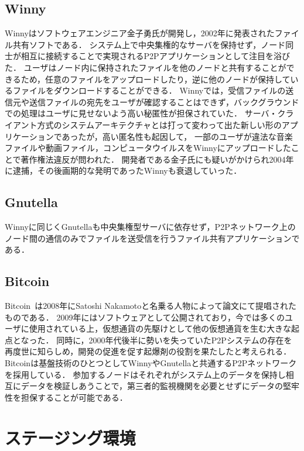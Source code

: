 \subsection{Winny}

Winnyはソフトウェアエンジニア金子勇氏が開発し，2002年に発表されたファイル共有ソフトである．
システム上で中央集権的なサーバを保持せず，ノード同士が相互に接続することで実現されるP2Pアプリケーションとして注目を浴びた．
ユーザはノード内に保持されたファイルを他のノードと共有することができるため，任意のファイルをアップロードしたり，逆に他のノードが保持しているファイルをダウンロードすることができる．
Winnyでは，受信ファイルの送信元や送信ファイルの宛先をユーザが確認することはできず，バックグラウンドでの処理はユーザに見せないよう高い秘匿性が担保されていた．
サーバ・クライアント方式のシステムアーキテクチャとは打って変わって出た新しい形のアプリケーションであったが，高い匿名性も起因して，
一部のユーザが違法な音楽ファイルや動画ファイル，コンピュータウイルスをWinnyにアップロードしたことで著作権法違反が問われた．
開発者である金子氏にも疑いがかけられ2004年に逮捕，その後画期的な発明であったWinnyも衰退していった．

\subsection{Gnutella}

Winnyに同じくGnutellaも中央集権型サーバに依存せず，P2Pネットワーク上のノード間の通信のみでファイルを送受信を行うファイル共有アプリケーションである．

\subsection{Bitcoin}

Bitcoin~\cite{Bitcoin}は2008年にSatoshi Nakamotoと名乗る人物によって論文にて提唱されたものである．
2009年にはソフトウェアとして公開されており，今では多くのユーザに使用されている上，仮想通貨の先駆けとして他の仮想通貨を生む大きな起点となった．
同時に，2000年代後半に勢いを失っていたP2Pシステムの存在を再度世に知らしめ，開発の促進を促す起爆剤の役割を果たしたと考えられる．
Bitcoinは基盤技術のひとつとしてWinnyやGnutellaと共通するP2Pネットワークを採用している．
参加するノードはそれぞれがシステム上のデータを保持し相互にデータを検証しあうことで，第三者的監視機関を必要とせずにデータの堅牢性を担保することが可能である．

\section{ステージング環境}

